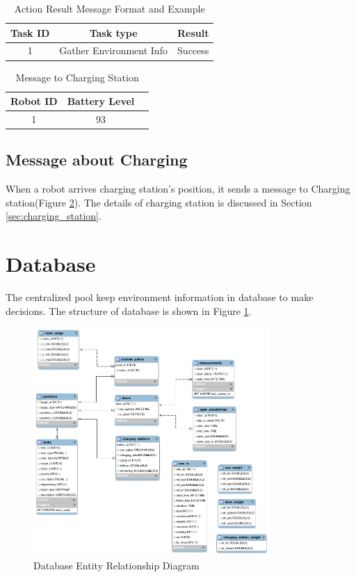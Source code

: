 \begin{table}[htb]
\centering
\begin{tabular}{|c|c|c|} 
\hline
Task ID 	& Task type	& Result\\
\hline\hline
1 & Gather Environment Info & Success \\ [1ex] 
\hline
\end{tabular}
\caption{Action Result Message Format and Example}
\label{tab:result_message}
\end{table}


\begin{table}[htb]
\centering
\begin{tabular}{|c|c|c|} 
\hline
Robot ID & Battery Level \\
\hline\hline
1 & 93 \\ [1ex] 
\hline
\end{tabular}
\caption{Message to Charging Station}
\label{tab:message_to_charging_staion}
\end{table}

\subsection{Message about Charging}
  
When a robot arrives charging station's position, it sends a message to Charging station(Figure \ref{tab:message_to_charging_staion}). The details of charging station is discussed in Section \ref{sec:charging_station}. 

\section{Database}
The centralized pool keep environment information in database to make decisions. The structure of database is shown in Figure \ref{fig:database_er}.

\begin{figure}[htbp]
\centering
\includegraphics[width = 0.8\textwidth]{content/images/ch4/database_er.png}
\caption{Database Entity Relationship Diagram}
\label{fig:database_er}
\end{figure}

